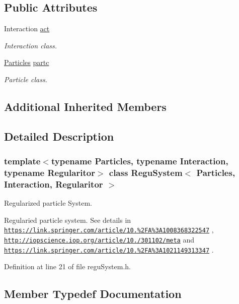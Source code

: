 \subsection*{Public Attributes}
\begin{DoxyCompactItemize}
\item 
Interaction \mbox{\hyperlink{class_regu_system_a41e5c73bc46164302db25b5c5d28aedd}{act}}
\begin{DoxyCompactList}\small\item\em Interaction class. \end{DoxyCompactList}\item 
\mbox{\hyperlink{struct_particles}{Particles}} \mbox{\hyperlink{class_regu_system_a48cb24fbd9d72503a5e464a02760e814}{partc}}
\begin{DoxyCompactList}\small\item\em Particle class. \end{DoxyCompactList}\end{DoxyCompactItemize}
\subsection*{Additional Inherited Members}


\subsection{Detailed Description}
\subsubsection*{template$<$typename Particles, typename Interaction, typename Regularitor$>$\newline
class Regu\+System$<$ Particles, Interaction, Regularitor $>$}

Regularized particle System. 

Regularied particle system. See details in \href{https://link.springer.com/article/10.1023%2FA%3A1008368322547}{\tt https\+://link.\+springer.\+com/article/10.\+1023\%2\+F\+A\%3\+A1008368322547} , \href{http://iopscience.iop.org/article/10.1086/301102/meta}{\tt http\+://iopscience.\+iop.\+org/article/10.\+1086/301102/meta} and \href{https://link.springer.com/article/10.1023%2FA%3A1021149313347}{\tt https\+://link.\+springer.\+com/article/10.\+1023\%2\+F\+A\%3\+A1021149313347} . 

Definition at line 21 of file regu\+System.\+h.



\subsection{Member Typedef Documentation}
\mbox{\label{class_regu_system_a03193786fed192f0c8563b38bc883d63}} 
